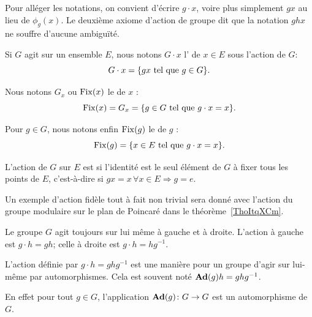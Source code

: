 Pour alléger les notations, on convient d'écrire $g \cdot x$, voire plus simplement $gx$ au lieu de \( \phi_g(x) \). Le deuxième axiome d'action de groupe dit que la notation $ghx$ ne souffre d'aucune ambiguïté.

\begin{definition}

    Si \( G\) agit sur un ensemble \( E\), nous notons \( G\cdot x\) l' de \( x\in E\) sous l'action de $G$:
\begin{equation*}
    G\cdot x = \{ gx \text{ tel que } g \in G\}.
\end{equation*}

Nous notons \( G_x\) ou \( \operatorname{Fix}(x)\) le  de \( x\) :
\begin{equation}
    \operatorname{Fix}(x)=G_x=\{ g\in G\text{ tel que } g\cdot x=x \}.
\end{equation}

    Pour \( g\in G\), nous notons enfin \( \operatorname{Fix}(g)\) le  de \( g\) :
\begin{equation}
    \operatorname{Fix}(g)=\{ x\in E\text{ tel que } g\cdot x=x \}.
\end{equation}

\end{definition}

\begin{definition}  \label{DefuyYJRh}
    L'action de \( G\) sur \( E\) est  si l'identité est le seul élément de \( G\) à fixer tous les points de \( E\), c'est-à-dire si \( gx=x\,\forall x\in E\Rightarrow g=e\).
\end{definition}

Un exemple d'action fidèle tout à fait non trivial sera donné avec l'action du groupe modulaire sur le plan de Poincaré dans le théorème~\ref{ThoItqXCm}.

Le groupe \( G\) agit toujours sur lui même à gauche et à droite. L'action à gauche est \( g\cdot h=gh\); celle à droite est \( g\cdot h=hg^{-1}\).

\begin{definition}      \label{DEFooCORTooEeOLPT}
    L'action  définie par \( g\cdot h=ghg^{-1}\) est une manière pour un groupe d'agir sur lui-même par automorphismes. Cela est souvent noté \( \operatorname{\textbf{Ad}}(g)h=ghg^{-1}\).
\end{definition}
En effet pour tout \( g\in G\), l'application \( \operatorname{\textbf{Ad}}(g)\colon G\to G\) est un automorphisme de \( G\).

